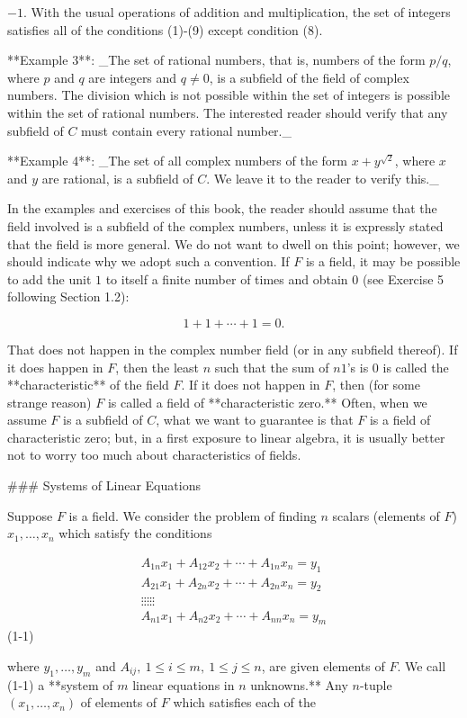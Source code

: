 \(-1\). With the usual operations of addition and multiplication, the set of integers satisfies all of the conditions (1)-(9) except condition (8).

**Example 3**: _The set of rational numbers, that is, numbers of the form \(p/q\), where \(p\) and \(q\) are integers and \(q\neq 0\), is a subfield of the field of complex numbers. The division which is not possible within the set of integers is possible within the set of rational numbers. The interested reader should verify that any subfield of \(C\) must contain every rational number._

**Example 4**: _The set of all complex numbers of the form \(x+y^{\sqrt{2}}\), where \(x\) and \(y\) are rational, is a subfield of \(C\). We leave it to the reader to verify this._

In the examples and exercises of this book, the reader should assume that the field involved is a subfield of the complex numbers, unless it is expressly stated that the field is more general. We do not want to dwell on this point; however, we should indicate why we adopt such a convention. If \(F\) is a field, it may be possible to add the unit \(1\) to itself a finite number of times and obtain \(0\) (see Exercise 5 following Section 1.2):

\[1+1+\cdots+1=0.\]

That does not happen in the complex number field (or in any subfield thereof). If it does happen in \(F\), then the least \(n\) such that the sum of \(n\)\(1\)'s is \(0\) is called the **characteristic** of the field \(F\). If it does not happen in \(F\), then (for some strange reason) \(F\) is called a field of **characteristic zero.** Often, when we assume \(F\) is a subfield of \(C\), what we want to guarantee is that \(F\) is a field of characteristic zero; but, in a first exposure to linear algebra, it is usually better not to worry too much about characteristics of fields.

### Systems of Linear Equations

Suppose \(F\) is a field. We consider the problem of finding \(n\) scalars (elements of \(F\)) \(x_{1},\ldots,x_{n}\) which satisfy the conditions

\[\begin{array}{c}A_{1n}x_{1}+A_{12}x_{2}+\cdots+A_{1n}x_{n}=y_{1}\\ A_{21}x_{1}+A_{2n}x_{2}+\cdots+A_{2n}x_{n}=y_{2}\\ \vdots\vdots\vdots\vdots\vdots\\ A_{n1}x_{1}+A_{n2}x_{2}+\cdots+A_{nn}x_{n}=y_{m}\end{array}\] (1-1)

where \(y_{1},\ldots,y_{m}\) and \(A_{ij},\ 1\leq i\leq m,\ 1\leq j\leq n\), are given elements of \(F\). We call (1-1) a **system of \(m\) linear equations in \(n\) unknowns.** Any \(n\)-tuple \((x_{1},\ldots,x_{n})\) of elements of \(F\) which satisfies each of the 